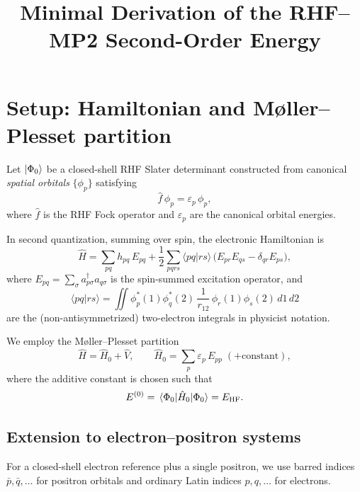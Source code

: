 \documentclass[11pt]{article}
\title{Minimal Derivation of the RHF--MP2 Second-Order Energy}
\author{}
\date{}
\begin{document}
\maketitle

\section*{Setup: Hamiltonian and M{\o}ller--Plesset partition}

Let $\ket{\Phi_0}$ be a closed-shell RHF Slater determinant constructed from
canonical \emph{spatial orbitals} $\{\phi_p\}$ satisfying
\begin{equation}
\hat f\,\phi_p = \varepsilon_p\,\phi_p,
\end{equation}
where $\hat f$ is the RHF Fock operator and $\varepsilon_p$ are the canonical
orbital energies.

In second quantization, summing over spin, the electronic Hamiltonian is
\begin{equation}
\hat H
=
\sum_{pq} h_{pq}\, E_{pq}
+
\frac{1}{2}\sum_{pqrs} \langle pq | rs\rangle\,
\bigl(E_{pr}E_{qs} - \delta_{qr}E_{ps}\bigr),
\end{equation}
where $E_{pq} = \sum_\sigma a_{p\sigma}^\dagger a_{q\sigma}$ is the
spin-summed excitation operator, and
\begin{equation}
\langle pq | rs\rangle
=
\iint \phi_p^*(1)\phi_q^*(2)\,\frac{1}{r_{12}}\,
\phi_r(1)\phi_s(2)\,d1\,d2
\end{equation}
are the (non-antisymmetrized) two-electron integrals in physicist notation.

We employ the M{\o}ller--Plesset partition
\begin{equation}
\hat H = \hat H_0 + \hat V,
\qquad
\hat H_0 = \sum_p \varepsilon_p\, E_{pp} \; (+\text{constant}),
\end{equation}
where the additive constant is chosen such that
\begin{equation}
E^{(0)} = \mel{\Phi_0}{\hat H_0}{\Phi_0} = E_{\mathrm{HF}}.
\end{equation}

\subsection*{Extension to electron--positron systems}

For a closed-shell electron reference plus a single positron, we use
barred indices $\bar p, \bar q, \ldots$ for positron orbitals and
ordinary Latin indices $p, q, \ldots$ for electrons.
\end{document}
